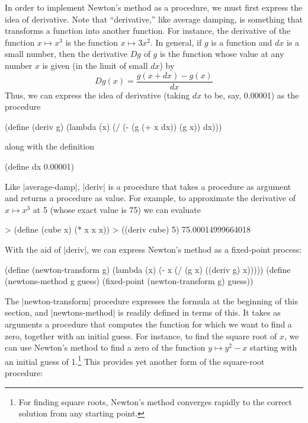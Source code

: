 In order to implement Newton's method as a procedure, we must first
express the idea of derivative.  Note that ``derivative,'' like
average damping, is something that transforms a function into another
function.  For instance, the derivative of the function $\textit{x}
\mapsto x^3$ is the function $x \mapsto 3x^2$.  In general, if $g$ is
a function and $dx$ is a small number, then the derivative $Dg$ of $g$
is the function whose value at any number $x$ is given (in the limit
of small $dx$) by \[Dg(x) = \frac{g(x+dx) - g(x)}{dx}\] Thus, we can
express the idea of derivative (taking $dx$ to be, say, 0.00001) as
the procedure

\begin{schemedisplay}
(define (deriv g)
  (lambda (x)
    (/ (- (g (+ x dx)) (g x))
       dx)))
\end{schemedisplay}
along with the definition

\begin{schemedisplay}
(define dx 0.00001)
\end{schemedisplay}

Like \scheme|average-damp|, \scheme|deriv| is a procedure that takes a
procedure as argument and returns a procedure as value.  For example,
to approximate the derivative of $x \mapsto x^3$ at 5 (whose exact
value is 75) we can evaluate

\begin{schemedisplay}
> (define (cube x) (* x x x))
> ((deriv cube) 5)
75.00014999664018
\end{schemedisplay}

With the aid of \scheme|deriv|, we can express Newton's method as a
fixed-point process:

\begin{schemedisplay}
(define (newton-transform g)
  (lambda (x)
    (- x (/ (g x) ((deriv g) x)))))
(define (newtons-method g guess)
  (fixed-point (newton-transform g) guess))
\end{schemedisplay}
The \scheme|newton-transform| procedure expresses the formula at the
beginning of this section, and \scheme|newtons-method| is readily
defined in terms of this.  It takes as arguments a procedure that
computes the function for which we want to find a zero, together with
an initial guess.  For instance, to find the square root of $x$, we
can use Newton's method to find a zero of the function $y \mapsto y^2
- x$ starting with an initial guess of 1.\footnote{For finding square
  roots, Newton's method converges rapidly to the correct solution
  from any starting point.} This provides yet another form of the
square-root procedure:

